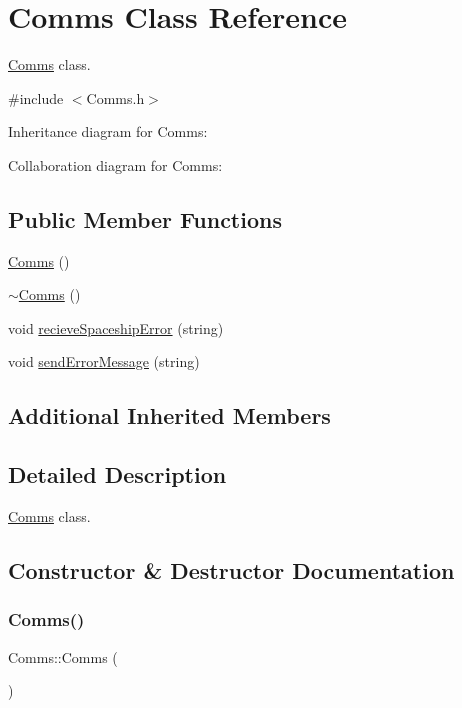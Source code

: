 \hypertarget{classComms}{}\section{Comms Class Reference}
\label{classComms}


\hyperlink{classComms}{Comms} class.  




{\ttfamily \#include $<$Comms.\+h$>$}



Inheritance diagram for Comms\+:


Collaboration diagram for Comms\+:
\subsection*{Public Member Functions}
\begin{DoxyCompactItemize}
\item 
\hyperlink{classComms_aa3878221ed907d6d6841ee77741c1f49}{Comms} ()
\item 
\hyperlink{classComms_ad18d3a80a82d18d27b0de3b551e4f5fc}{$\sim$\+Comms} ()
\item 
void \hyperlink{classComms_a1aed1c01a813afd55309fdc59d2871bf}{recieve\+Spaceship\+Error} (string)
\item 
void \hyperlink{classComms_a23c37f6d10f06c7cfe25c4dc7d62fa12}{send\+Error\+Message} (string)
\end{DoxyCompactItemize}
\subsection*{Additional Inherited Members}


\subsection{Detailed Description}
\hyperlink{classComms}{Comms} class. 

\subsection{Constructor \& Destructor Documentation}
\mbox{\label{classComms_aa3878221ed907d6d6841ee77741c1f49}} 
\subsubsection{\texorpdfstring{Comms()}{Comms()}}
{\footnotesize\ttfamily Comms\+::\+Comms (\begin{DoxyParamCaption}{ }\end{DoxyParamCaption})\hspace{0.3cm}{\ttfamily [inline]}}


